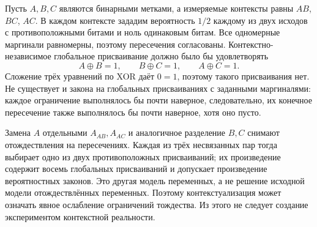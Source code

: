 \begin{example}
\label{ex:triangle}
{Пусть $A,B,C$ являются бинарными метками, а измеряемые контексты равны $AB$, $BC$, $AC$. В каждом контексте зададим вероятность $1/2$ каждому из двух исходов с противоположными битами и ноль одинаковым битам. Все одномерные маргинали равномерны, поэтому пересечения согласованы. Контекстно-независимое глобальное присваивание должно было бы удовлетворять}
\begin{equation}\label{eq:parity}
 A\oplus B=1,\qquad B\oplus C=1,\qquad A\oplus C=1.
\end{equation}
{Сложение трёх уравнений по XOR даёт $0=1$, поэтому такого присваивания нет. Не существует и закона на глобальных присваиваниях с заданными маргиналями: каждое ограничение выполнялось бы почти наверное, следовательно, их конечное пересечение также выполнялось бы почти наверное, хотя оно пусто.}
\end{example}

{Замена $A$ отдельными $A_{AB},A_{AC}$ и аналогичное разделение $B,C$ снимают отождествления на пересечениях. Каждая из трёх несвязанных пар тогда выбирает одно из двух противоположных присваиваний; их произведение содержит восемь глобальных присваиваний и допускает произведение вероятностных законов. Это другая модель переменных, а не решение исходной модели отождествлённых переменных. Поэтому контекстуализация может означать явное ослабление ограничений тождества. Из этого не следует создание экспериментом контекстной реальности.}

